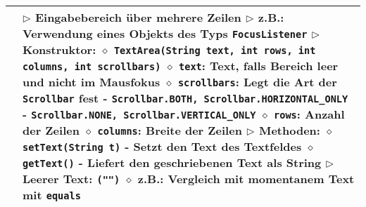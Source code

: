 \begin{longtable}{ | p{} p{} | }
	\makecell[l]{Klasse TextArea} & \makecell[l]{
	$\triangleright$ Eingabebereich über mehrere Zeilen \\
	$\triangleright$ z.B.: Verwendung eines Objekts des Typs \texttt{FocusListener} \\
	$\triangleright$ Konstruktor: \\
	\hspace{0.4cm} $\diamond$ \texttt{TextArea(String text, int rows, int columns, int scrollbars)} \\
	\hspace{0.4cm} $\diamond$ \texttt{text}: Text, falls Bereich leer und nicht im Mausfokus \\
	\hspace{0.4cm} $\diamond$ \texttt{scrollbars}: Legt die Art der \texttt{Scrollbar} fest \\
	\hspace{0.6cm} - \texttt{Scrollbar.BOTH, Scrollbar.HORIZONTAL\_ONLY} \\
	\hspace{0.6cm} - \texttt{Scrollbar.NONE, Scrollbar.VERTICAL\_ONLY} \\
	\hspace{0.4cm} $\diamond$ \texttt{rows}: Anzahl der Zeilen \\
	\hspace{0.4cm} $\diamond$ \texttt{columns}: Breite der Zeilen \\
	$\triangleright$ Methoden: \\
	\hspace{0.4cm} $\diamond$ \texttt{setText(String t)} \\
	\hspace{0.6cm} - Setzt den Text des Textfeldes \\
	\hspace{0.4cm} $\diamond$ \texttt{getText()} \\
	\hspace{0.6cm} - Liefert den geschriebenen Text als String \\
	$\triangleright$ Leerer Text: \texttt{(\string"\string")} \\
	\hspace{0.4cm} $\diamond$ z.B.: Vergleich mit momentanem Text mit \texttt{equals}} \\ \hline


\end{longtable}
